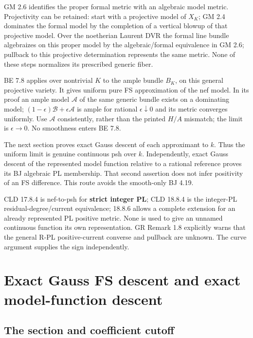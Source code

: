 \documentclass[
  11pt,
]{article}
\begin{document}
GM 2.6 identifies the proper formal metric with an algebraic model
metric. Projectivity can be retained: start with a projective model of
\(X_K\); GM 2.4 dominates the formal model by the completion of a
vertical blowup of that projective model. Over the noetherian Laurent
DVR the formal line bundle algebraizes on this proper model by the
algebraic/formal equivalence in GM 2.6; pullback to this projective
determination represents the same metric. None of these steps normalizes
its prescribed generic fiber.

BE 7.8 applies over nontrivial \(K\) to the ample bundle \(B_K\), on
this general projective variety. It gives uniform pure FS approximation
of the nef model. In its proof an ample model \(\mathcal A\) of the same
generic bundle exists on a dominating model;
\((1-\epsilon)\mathcal B+\epsilon\mathcal A\) is ample for rational
\(\epsilon\downarrow0\) and its metric converges uniformly. Use
\(\mathcal A\) consistently, rather than the printed \(H/A\) mismatch;
the limit is \(\epsilon\to0\). No smoothness enters BE 7.8.

The next section proves exact Gauss descent of each approximant to
\(k\). Thus the uniform limit is genuine continuous psh over \(k\).
Independently, exact Gauss descent of the represented model function
relative to a rational reference proves its BJ algebraic PL membership.
That second assertion does not infer positivity of an FS difference.
This route avoids the smooth-only BJ 4.19.

CLD 17.8.4 is nef-to-psh for \textbf{strict integer PL}; CLD 18.8.4 is
the integer-PL residual-degree/current equivalence; 18.8.6 allows a
complete extension for an already represented PL positive metric. None
is used to give an unnamed continuous function its own representation.
GR Remark 1.8 explicitly warns that the general R-PL positive-current
converse and pullback are unknown. The curve argument supplies the sign
independently.

\section{Exact Gauss FS descent and exact model-function
descent}\label{exact-gauss-fs-descent-and-exact-model-function-descent}

\subsection{The section and coefficient
cutoff}\label{the-section-and-coefficient-cutoff}
\end{document}

